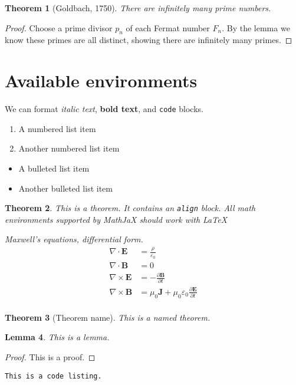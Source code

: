 \documentclass[12pt]{amsart}
\theoremstyle{plain}%
\newtheorem{thm}{Theorem}[section]
\newtheorem{lem}[thm]{Lemma}
\begin{document}
\begin{thm}[Goldbach, 1750]
    There are infinitely many prime numbers.
\end{thm}

\begin{proof}
    Choose a prime divisor $p_n$ of each Fermat number $F_n$.  By the lemma we know these primes are all distinct, showing there are infinitely many primes.
\end{proof}

\section{Available environments}

We can format \emph{italic text}, \textbf{bold text}, and \texttt{code} blocks.

\begin{enumerate}
    \item A numbered list item
    \item Another numbered list item
\end{enumerate}

\begin{itemize}
    \item A bulleted list item
    \item Another bulleted list item
\end{itemize}


\begin{thm}
    This is a theorem.  It contains an \texttt{align} block.  All math environments supported by MathJaX should work with LaTeX
    
    Maxwell's equations, differential form.
    \begin{align*}
        \nabla \cdot \mathbf{E} &= \frac {\rho} {\varepsilon_0} \\
        \nabla \cdot \mathbf{B} &= 0 \\
        \nabla \times \mathbf{E} &= -\frac{\partial \mathbf{B}} {\partial t} \\
        \nabla \times \mathbf{B} &= \mu_0 \mathbf{J} + \mu_0 \varepsilon_0 \frac{\partial \mathbf{E}} {\partial t} \\
    \end{align*}
\end{thm}

\begin{thm}[Theorem name]
    This is a named theorem.
\end{thm}

\begin{lem}
    This is a lemma.
\end{lem}

\begin{proof}
    This is a proof.
\end{proof}

\begin{lstlisting}
This is a code listing.
\end{lstlisting}
\end{document}
